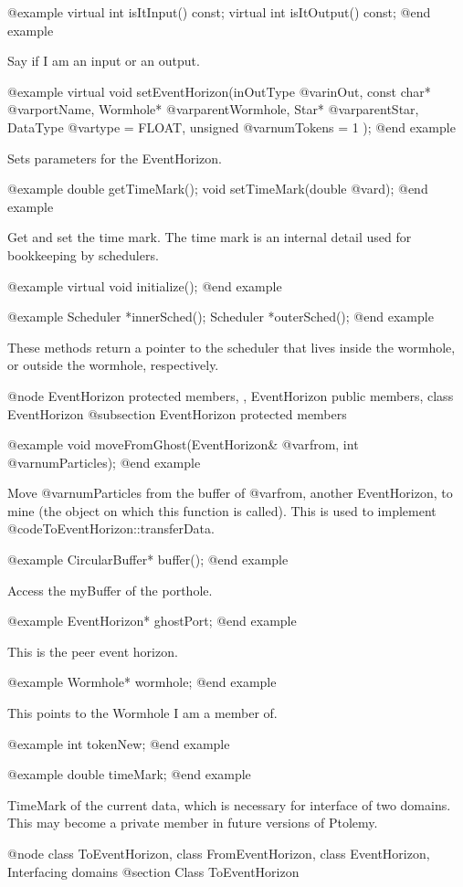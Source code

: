 @example
virtual int isItInput() const;
virtual int isItOutput() const;
@end example

Say if I am an input or an output.

@example
virtual void setEventHorizon(inOutType @var{inOut}, const char* @var{portName},
     Wormhole* @var{parentWormhole}, Star* @var{parentStar},
     DataType @var{type} = FLOAT, unsigned @var{numTokens} = 1 );
@end example

Sets parameters for the EventHorizon.

@example
double getTimeMark();
void setTimeMark(double @var{d});
@end example

Get and set the time mark.  The time mark is an internal detail used for
bookkeeping by schedulers.

@example
virtual void initialize();
@end example

@example
Scheduler *innerSched();
Scheduler *outerSched();
@end example

These methods return a pointer to the scheduler that lives inside the
wormhole, or outside the wormhole, respectively.

@node EventHorizon protected members,  , EventHorizon public members, class EventHorizon
@subsection EventHorizon protected members

@example
void moveFromGhost(EventHorizon& @var{from}, int @var{numParticles});
@end example

Move @var{numParticles} from the buffer of @var{from}, another
EventHorizon, to mine (the object on which this function is called).
This is used to implement @code{ToEventHorizon::transferData}.

@example
CircularBuffer* buffer();
@end example

Access the myBuffer of the porthole.

@example
EventHorizon* ghostPort;
@end example

This is the peer event horizon.

@example
Wormhole* wormhole;
@end example

This points to the Wormhole I am a member of.

@example
int tokenNew;
@end example

@example
double timeMark;
@end example

TimeMark of the current data, which is necessary for interface
of two domains.  This may become a private member in future versions
of Ptolemy.

@node class ToEventHorizon, class FromEventHorizon, class EventHorizon, Interfacing domains
@section Class ToEventHorizon

